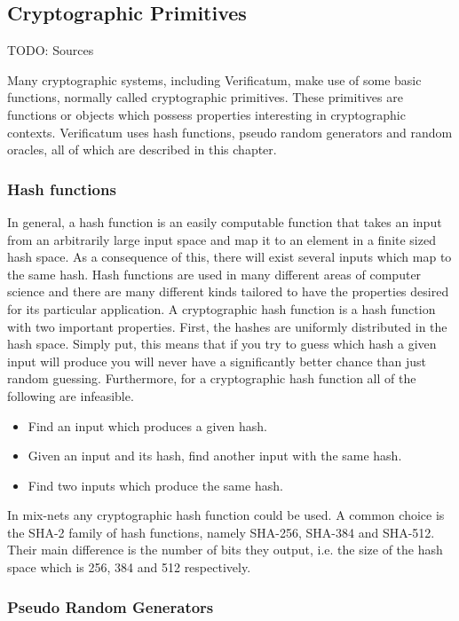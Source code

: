 \subsection{Cryptographic Primitives}

TODO: Sources

Many cryptographic systems, including Verificatum, make use of some
basic functions, normally called cryptographic primitives. These
primitives are functions or objects which possess properties
interesting in cryptographic contexts. Verificatum uses hash
functions, pseudo random generators and random oracles, all of which
are described in this chapter.

\subsubsection{Hash functions}
In general, a hash function is an easily computable function that
takes an input from an arbitrarily large input space and map it to an
element in a finite sized hash space. As a consequence of this, there
will exist several inputs which map to the same hash. Hash functions
are used in many different areas of computer science and there are
many different kinds tailored to have the properties desired for its
particular application. A cryptographic hash function is a hash
function with two important properties. First, the hashes are
uniformly distributed in the hash space. Simply put, this means that
if you try to guess which hash a given input will produce you will
never have a significantly better chance than just random
guessing. Furthermore, for a cryptographic hash function all of the
following are infeasible.

\begin{itemize}
\item Find an input which produces a given hash.
\item Given an input and its hash, find another input with the same hash.
\item Find two inputs which produce the same hash.
\end{itemize}

In mix-nets any cryptographic hash function could be used. A
common choice is the SHA-2 family of hash functions, namely SHA-256,
SHA-384 and SHA-512. Their main difference is the number of bits they
output, i.e. the size of the hash space which is 256, 384 and 512
respectively.

\subsubsection{Pseudo Random Generators}

